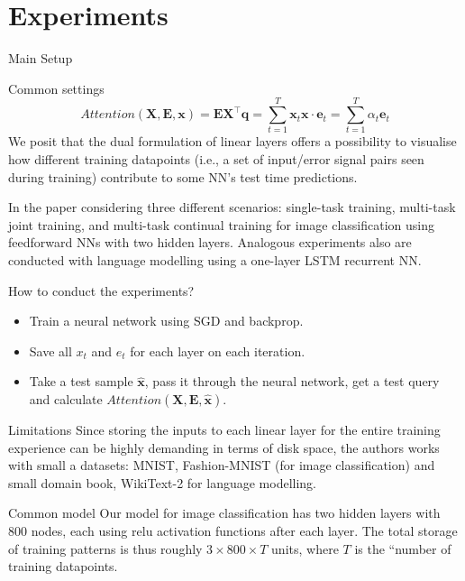 \documentclass{beamer}
\begin{document}
\section{Experiments}

\begin{frame}{Main Setup}
    \begin{block}{Common settings}
    \begin{equation*}
        Attention(\mathbf{X}, \mathbf{E}, \mathbf{x}) = \mathbf{E}\mathbf{X}^\top\mathbf{q} = \sum_{t=1}^T  \mathbf{x}_t\mathbf{x}\cdot\mathbf{e}_t = \sum_{t=1}^T\alpha_t\mathbf{e}_t
    \end{equation*}
        We posit that the dual formulation of linear layers offers a possibility to visualise how different training datapoints (i.e., a set of input/error signal pairs seen during training) contribute to some NN’s test time predictions.

        In the paper considering three different scenarios: single-task training, multi-task joint training, and multi-task continual training for image classification using feedforward NNs with two hidden layers. Analogous experiments also are conducted with language modelling using a one-layer LSTM recurrent NN.
    \end{block}
\end{frame}

\begin{block}{How to conduct the experiments?}
    \begin{itemize}
        \item Train a neural network using SGD and backprop.
        \item Save all $x_t$ and $e_t$ for each layer on each iteration.
        \item Take a test sample $\hat{\mathbf{x}}$, pass it through the neural network, get a test query and calculate $Attention(\mathbf{X}, \mathbf{E}, \hat{\mathbf{x}})$. 
    \end{itemize}
\end{block}

\begin{block}{Limitations}
    Since storing the inputs to each linear layer for the entire training experience can be highly demanding in terms of disk space, the authors works with small a datasets: MNIST, Fashion-MNIST (for image classification) and small domain book, WikiText-2 for language modelling. 
\end{block}

\begin{block}{Common model}
    Our model for image classification has two hidden layers with 800 nodes, each using relu activation functions after each layer. The total storage of training patterns is thus roughly $3\times800\times T$ units, where $T$ is the “number of training datapoints.
\end{block}
\end{document}
